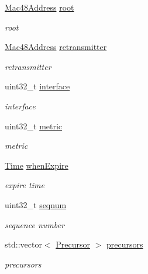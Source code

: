\begin{DoxyCompactItemize}
\item 
\hyperlink{classns3_1_1Mac48Address}{Mac48\+Address} \hyperlink{structns3_1_1dot11s_1_1HwmpRtable_1_1ProactiveRoute_a42d8bbf612313efa6d8abe0f8aeae186}{root}
\begin{DoxyCompactList}\small\item\em root \end{DoxyCompactList}\item 
\hyperlink{classns3_1_1Mac48Address}{Mac48\+Address} \hyperlink{structns3_1_1dot11s_1_1HwmpRtable_1_1ProactiveRoute_abb707d798427423e58ef73b2e2aed9f6}{retransmitter}
\begin{DoxyCompactList}\small\item\em retransmitter \end{DoxyCompactList}\item 
uint32\+\_\+t \hyperlink{structns3_1_1dot11s_1_1HwmpRtable_1_1ProactiveRoute_a7eabce1dbb38ac9f1f6c5849f8534d64}{interface}
\begin{DoxyCompactList}\small\item\em interface \end{DoxyCompactList}\item 
uint32\+\_\+t \hyperlink{structns3_1_1dot11s_1_1HwmpRtable_1_1ProactiveRoute_a126114d38ab43a178bce4de9e9906a2c}{metric}
\begin{DoxyCompactList}\small\item\em metric \end{DoxyCompactList}\item 
\hyperlink{classns3_1_1Time}{Time} \hyperlink{structns3_1_1dot11s_1_1HwmpRtable_1_1ProactiveRoute_aba399b6191c1c8998b0d1a2013f3bbc6}{when\+Expire}
\begin{DoxyCompactList}\small\item\em expire time \end{DoxyCompactList}\item 
uint32\+\_\+t \hyperlink{structns3_1_1dot11s_1_1HwmpRtable_1_1ProactiveRoute_abd6cc9a9b395eecbacd323fb6e24b539}{seqnum}
\begin{DoxyCompactList}\small\item\em sequence number \end{DoxyCompactList}\item 
std\+::vector$<$ \hyperlink{structns3_1_1dot11s_1_1HwmpRtable_1_1Precursor}{Precursor} $>$ \hyperlink{structns3_1_1dot11s_1_1HwmpRtable_1_1ProactiveRoute_a64eb3beb73dbdf698f92ffe93ce72def}{precursors}
\begin{DoxyCompactList}\small\item\em precursors \end{DoxyCompactList}\end{DoxyCompactItemize}



